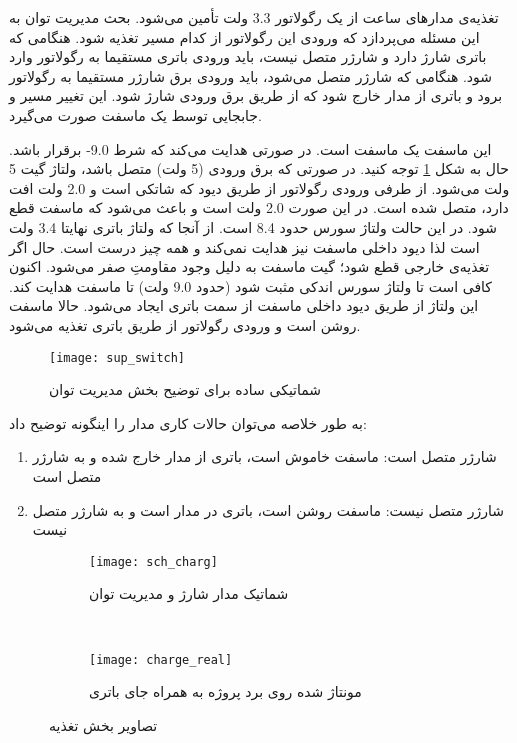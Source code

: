 تغذیه‌ی مدارهای ساعت از یک رگولاتور 3.3 ولت تأمین می‌شود. بحث مدیریت توان به این مسئله می‌پردازد که ورودی این رگولاتور از کدام مسیر تغذیه شود. هنگامی که باتری شارژ دارد و شارژر متصل نیست، باید ورودی باتری مستقیما به رگولاتور وارد شود. هنگامی که شارژر متصل می‌شود، باید ورودی برق شارژر مستقیما به رگولاتور برود و باتری از مدار خارج شود که از طریق برق ورودی شارژ شود. این تغییر مسیر و جابجایی توسط یک ماسفت  صورت می‌گیرد.

این ماسفت یک ماسفت  است. در صورتی هدایت می‌کند که شرط 9.0-
برقرار باشد. حال به شکل \ref{fig:sup-switch} توجه کنید. در صورتی که برق ورودی (5 ولت) متصل باشد، ولتاژ گیت 5 ولت می‌شود. از طرفی ورودی رگولاتور از طریق دیود  که شاتکی است و 2.0 ولت افت دارد، متصل شده است. در این صورت
2.0 ولت است و باعث می‌شود که ماسفت قطع شود. در این حالت ولتاژ سورس حدود 8.4 است. از آنجا که ولتاژ باتری نهایتا 3.4 ولت است لذا دیود داخلی ماسفت نیز هدایت نمی‌کند و همه چیز درست است. حال اگر تغذیه‌ی خارجی قطع شود؛ گیت ماسفت به دلیل وجود مقاومتِ  صفر می‌شود. اکنون کافی است تا ولتاژ سورس اندکی مثبت شود (حدود 9.0 ولت) تا ماسفت هدایت کند. این ولتاژ از طریق دیود داخلی ماسفت از سمت باتری ایجاد می‌شود. حالا ماسفت روشن است و ورودی رگولاتور از طریق باتری تغذیه می‌شود. 

\begin{figure}[h]
	\centering
	\texttt{[image: sup\_switch]}
	\caption{شماتیکی ساده برای توضیح بخش مدیریت توان}
	\label{fig:sup-switch}
\end{figure}

به طور خلاصه می‌توان حالات کاری مدار را اینگونه توضیح داد:
\begin{enumerate}
	\item شارژر متصل است: ماسفت خاموش است، باتری از مدار خارج شده و به شارژر متصل است
	\item 	شارژر متصل نیست: ماسفت روشن است، باتری در مدار است و به شارژر متصل نیست 
\end{enumerate}

\begin{figure}[h!]
	\centering
	\begin{subfigure}{\textwidth}
		\centering
		\texttt{[image: sch\_charg]}
		\caption{شماتیک مدار شارژ و مدیریت توان}
	\end{subfigure}\\
	\begin{subfigure}{\textwidth}
		\centering
		\texttt{[image: charge\_real]}
		\caption{مونتاژ شده روی برد پروژه به همراه جای باتری}
	\end{subfigure}
	\caption{تصاویر بخش تغذیه}
	\label{fig:charge}
\end{figure}

